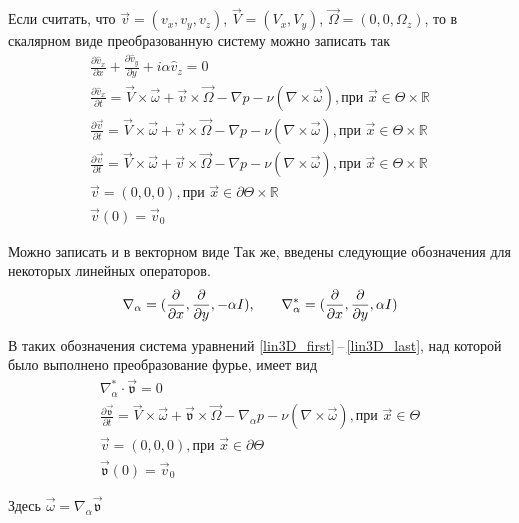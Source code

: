 Если считать, что $\vec v = (v_x, v_y, v_z)$, $\vec V = (V_x, V_y)$, $\vec \Omega = (0, 0, \Omega_z)$, то в скалярном виде преобразованную систему можно записать так
\begin{gather} 
  \label{scalar3D_first}
 \frac{\partial \hat v_x}{\partial x} + \frac{\partial \hat v_y}{\partial y} + i\alpha \hat v_z= 0\\
% 
 \frac{\partial \hat v_x}{\partial t} = \vec V \times \vec \omega + \vec v \times \vec \Omega - \nabla p - \nu ( \nabla \times \vec \omega ), \text{при } \vec x \in \Theta \times \mathbb{R}\\
% 
 \frac{\partial \vec v}{\partial t} = \vec V \times \vec \omega + \vec v \times \vec \Omega - \nabla p - \nu ( \nabla \times \vec \omega ), \text{при } \vec x \in \Theta \times \mathbb{R}\\
% 
 \frac{\partial \vec v}{\partial t} = \vec V \times \vec \omega + \vec v \times \vec \Omega - \nabla p - \nu ( \nabla \times \vec \omega ), \text{при } \vec x \in \Theta \times \mathbb{R}\\
% 
 \vec v = (0,0,0), \text{при } \vec x \in \partial \Theta \times \mathbb{R} \\
 \vec v (0) = \vec v _0 
  \label{scalar3D_last}
\end{gather}







Можно записать и в векторном виде
Так же, введены следующие обозначения для некоторых линейных операторов.
$$
  \nabla_\alpha = (\frac{\partial}{\partial x},\frac{\partial}{\partial y},-\alpha I)\text{,\qquad} 
  \nabla_\alpha^* = (\frac{\partial}{\partial x},\frac{\partial}{\partial y},\alpha I) 
$$

В таких обозначения система уравнений \ref{lin3D_first}\,--\,\ref{lin3D_last}, над которой было выполнено преобразование фурье, имеет вид
\begin{gather} 
  \label{ft3D_first}
  \nabla_\alpha^* \cdot  \mathfrak{\vec v} = 0\\
  \frac{\partial \mathfrak{\vec v}}{\partial t} = \vec V \times \mathfrak{\vec \omega} + \mathfrak{\vec v} \times \vec \Omega - \nabla_\alpha p - \nu ( \nabla \times \mathfrak{\vec \omega} ), \text{при } \vec x \in \Theta\\
  \vec v = (0,0,0), \text{при } \vec x \in \partial \Theta\\
  \mathfrak{\vec v} (0) = \vec v _0 \label{ft3D_last}
\end{gather}

Здесь $\mathfrak{\vec \omega} = \nabla_\alpha \mathfrak{\vec v}$ 